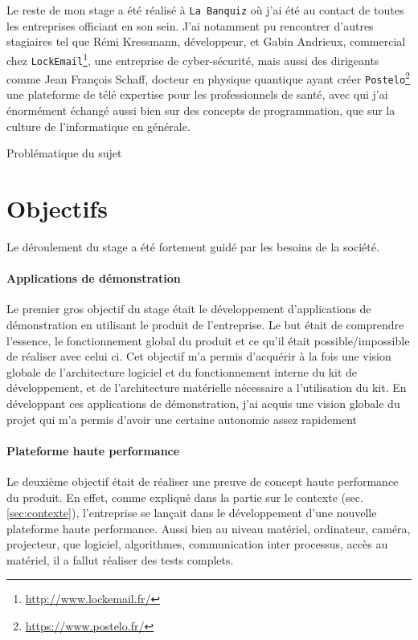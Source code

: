 Le reste de mon stage a été réalisé à \texttt{La Banquiz} où j'ai été au contact de toutes les entreprises officiant en son sein. J'ai notamment pu rencontrer d'autres stagiaires tel que Rémi Kressmann, développeur, et Gabin Andrieux, commercial chez \texttt{LockEmail}\footnote{\href{http://www.lockemail.fr/}{http://www.lockemail.fr/}}, une entreprise de cyber-sécurité, mais aussi des dirigeants comme Jean François Schaff, docteur en physique quantique ayant créer \texttt{Postelo}\footnote{\href{https://www.postelo.fr/}{https://www.postelo.fr/}} une plateforme de télé expertise pour les professionnels de santé, avec qui j'ai énormément échangé aussi bien sur des concepts de programmation, que sur la culture de l'informatique en générale.

\begin{center}
Problématique du sujet
\end{center}

\section{Objectifs}
Le déroulement du stage a été fortement guidé par les besoins de la société.

\paragraph{Applications de démonstration} Le premier gros objectif du stage était le développement d'applications de démonstration en utilisant le produit de l'entreprise. Le but était de comprendre l'essence, le fonctionnement global du produit et ce qu'il était possible/impossible de réaliser avec celui ci. Cet objectif m'a permis d'acquérir à la fois une vision globale de l'architecture logiciel et du fonctionnement interne du kit de développement, et de l'architecture matérielle nécessaire a l'utilisation du kit. En développant ces applications de démonstration, j'ai acquis une vision globale du projet qui m'a permis d'avoir une certaine autonomie assez rapidement

\paragraph{Plateforme haute performance} Le deuxième objectif était de réaliser une preuve de concept haute performance du produit. En effet, comme expliqué dans la partie sur le contexte (sec. \ref{sec:contexte}), l'entreprise se lançait dans le développement d'une nouvelle plateforme haute performance. Aussi bien au niveau matériel, ordinateur, caméra, projecteur, que logiciel, algorithmes, communication inter processus, accès au matériel, il a fallut réaliser des tests complets.

